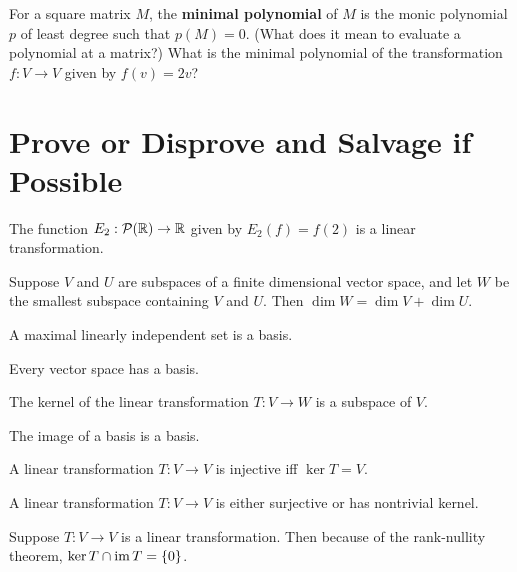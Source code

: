 \documentclass{homework}
\begin{document}
\begin{problem}\label{definition-minimal-polynomial}For a square matrix $M$, the \textbf{minimal polynomial} of $M$ is
  the monic polynomial $p$ of least degree such that $p(M) = 0$.
  (What does it mean to evaluate a polynomial at a matrix?)  What is
  the minimal polynomial of the transformation $f : V \to V$ given by
  $f(v) = 2v$?
\end{problem}

\section{Prove or Disprove and Salvage if Possible}

\begin{problem}
  The function $E_2 : \mathcal{P}(\mathbb{R}) \to \mathbb{R}$ given by $E_2(f) = f(2)$ is a linear transformation.
\end{problem}

\begin{problem}
  Suppose $V$ and $U$ are subspaces of a finite dimensional vector
  space, and let $W$ be the smallest subspace containing $V$ and $U$.
  Then $\dim W = \dim V + \dim U$.
\end{problem}

\begin{problem}
  A maximal linearly independent set is a basis.
\end{problem}

\begin{problem}
  Every vector space has a basis.
\end{problem}

\begin{problem}
  The kernel of the linear transformation $T : V \to W$ is a subspace of $V$.
\end{problem}

\begin{problem}
  The image of a basis is a basis.
\end{problem}

\begin{problem} %
  A linear transformation $T : V \to V$ is injective iff $\ker T = V$.
\end{problem}

\begin{problem}
  A linear transformation $T : V \to V$ is either surjective or has nontrivial kernel.
\end{problem}

\begin{problem}
  Suppose $T : V \to V$ is a linear transformation.  Then because of the rank-nullity theorem, $\ker T \cap \operatorname{im} T = \{0\}$.
\end{problem}
\end{document}
